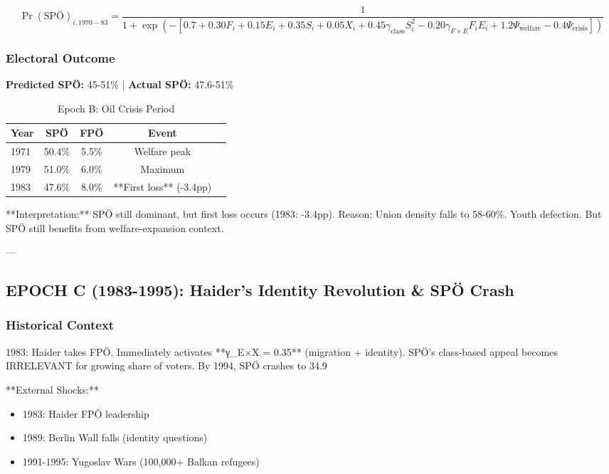 $$\Pr(\text{SPÖ})_{i,1970-83} = \frac{1}{1 + \exp(-[0.7 + 0.30 F_i + 0.15 E_i + 0.35 S_i + 0.05 X_i + 0.45 \gamma_{\text{class}} S_i^2 - 0.20 \gamma_{F \times E} F_i E_i + 1.2 \Psi_{\text{welfare}} - 0.4 \Psi_{\text{crisis}}])}$$

\subsubsection{Electoral Outcome}

\textbf{Predicted SPÖ:} 45-51\% | \textbf{Actual SPÖ:} 47.6-51\%

\begin{table}[h]
\centering
\caption{Epoch B: Oil Crisis Period}
\label{tab:epochb-spo}
\begin{tabular}{lcccc}
\toprule
Year & SPÖ & FPÖ & Event \\
\midrule
1971 & 50.4\% & 5.5\% & Welfare peak \\
1979 & 51.0\% & 6.0\% & Maximum \\
1983 & 47.6\% & 8.0\% & **First loss** (-3.4pp) \\
\bottomrule
\end{tabular}
\end{table}

**Interpretation:** SPÖ still dominant, but first loss occurs (1983: -3.4pp). Reason: Union density falls to 58-60\%. Youth defection. But SPÖ still benefits from welfare-expansion context.

---

\subsection{EPOCH C (1983-1995): Haider's Identity Revolution \& SPÖ Crash}

\subsubsection{Historical Context}

1983: Haider takes FPÖ. Immediately activates **γ_{E×X} = 0.35** (migration + identity). SPÖ's class-based appeal becomes IRRELEVANT for growing share of voters. By 1994, SPÖ crashes to 34.9%

**External Shocks:**
\begin{itemize}
\item 1983: Haider FPÖ leadership
\item 1989: Berlin Wall falls (identity questions)
\item 1991-1995: Yugoslav Wars (100,000+ Balkan refugees)
\end{itemize}

